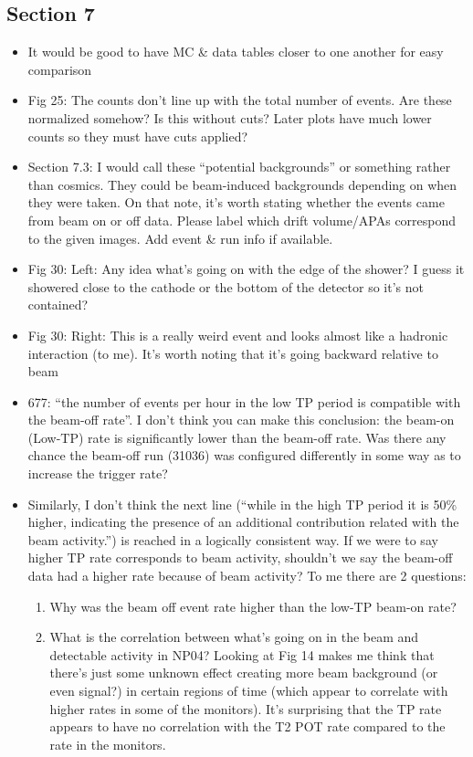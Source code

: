 \documentclass[11pt]{article}
\begin{document}
\subsection*{Section 7}
\begin{itemize}
    \item It would be good to have MC \& data tables closer to one another for easy comparison
    \item Fig 25: The counts don’t line up with the total number of events. Are these normalized somehow? Is this without cuts? Later plots have much lower counts so they must have cuts applied?
    \item Section 7.3: I would call these “potential backgrounds” or something rather than cosmics. They could be beam-induced backgrounds depending on when they were taken. On that note, it’s worth stating whether the events came from beam on or off data. Please label which drift volume/APAs correspond to the given images. Add event \& run info if available.
    \item Fig 30: Left: Any idea what’s going on with the edge of the shower? I guess it showered close to the cathode or the bottom of the detector so it’s not contained? 
    \item Fig 30: Right: This is a really weird event and looks almost like a hadronic interaction (to me). It’s worth noting that it’s going backward relative to beam
    \item 677: “the number of events per hour in the low TP period is compatible with the beam-off rate”. I don’t think you can make this conclusion: the beam-on (Low-TP) rate is significantly lower than the beam-off rate. Was there any chance the beam-off run (31036) was configured differently in some way as to increase the trigger rate?
    \item Similarly, I don’t think the next line (“while in the high TP period it is 50\% higher, indicating the presence of an additional contribution related with the beam activity.”) is reached in a logically consistent way. If we were to say higher TP rate corresponds to beam activity, shouldn’t we say the beam-off data had a higher rate because of beam activity? To me there are 2 questions:
    \begin{enumerate}
        \item Why was the beam off event rate higher than the low-TP beam-on rate?
        \item What is the correlation between what’s going on in the beam and detectable activity in NP04? Looking at Fig 14 makes me think that there’s just some unknown effect creating more beam background (or even signal?) in certain regions of time (which appear to correlate with higher rates in some of the monitors). It’s surprising that the TP rate appears to have no correlation with the T2 POT rate compared to the rate in the monitors.

\end{enumerate}
\end{itemize}
\end{document}
